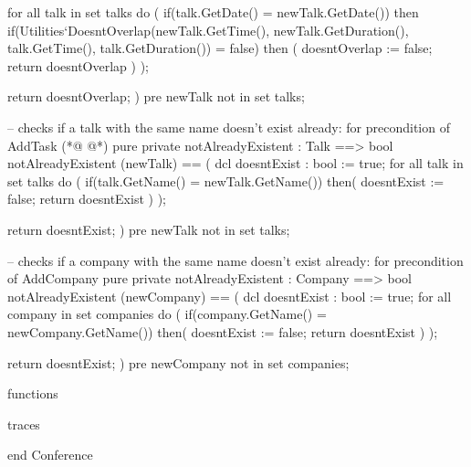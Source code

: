 \begin{vdmpp}[breaklines=true]
    for all talk in set talks do (
     if(talk.GetDate() = newTalk.GetDate())
      then if(Utilities`DoesntOverlap(newTalk.GetTime(), newTalk.GetDuration(), talk.GetTime(), talk.GetDuration()) = false)
           then 
           (
              doesntOverlap := false;
              return doesntOverlap
           )
     );
     
     return doesntOverlap;
    )
    pre newTalk not in set talks;
    
  -- checks if a talk with the same name doesn't exist already: for precondition of AddTask
(*@
\label{notAlreadyExistent:157}
@*)
    pure private notAlreadyExistent : Talk ==> bool
    notAlreadyExistent (newTalk) == (
    dcl doesntExist : bool := true;
    for all talk in set talks do (
     if(talk.GetName() = newTalk.GetName())
     then(
        doesntExist := false;
        return doesntExist
       )
     );
     
     return doesntExist;
    )
    pre newTalk not in set talks;
    
   -- checks if a company with the same name doesn't exist already: for precondition of AddCompany
    pure private notAlreadyExistent : Company ==> bool
    notAlreadyExistent (newCompany) == (
    dcl doesntExist : bool := true;
    for all company in set companies do (
     if(company.GetName() = newCompany.GetName())
     then(
        doesntExist := false;
        return doesntExist
       )
     );
     
     return doesntExist;
    )
    pre newCompany not in set companies;
   
  
functions

traces

end Conference
\end{vdmpp}
